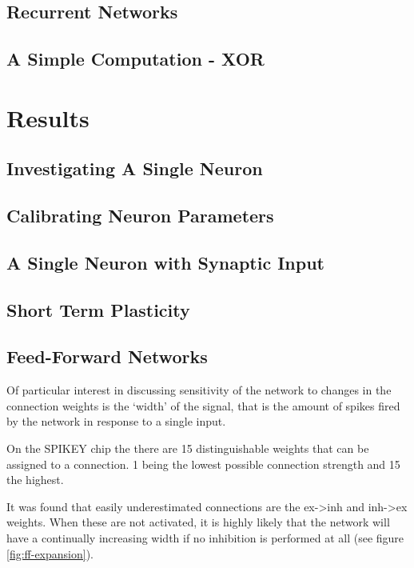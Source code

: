 \documentclass[10pt,a4paper]{article}
\begin{document}
\subsection{Recurrent Networks}

\subsection{A Simple Computation - XOR}

\section{Results}

\subsection{Investigating A Single Neuron}

\subsection{Calibrating Neuron Parameters}

\subsection{A Single Neuron with Synaptic Input}

\subsection{Short Term Plasticity}

\subsection{Feed-Forward Networks}
Of particular interest in discussing sensitivity of the network to changes in
the connection weights is the `width' of the signal, that is the amount of
spikes fired by the network in response to a single input.

On the SPIKEY chip the there are 15 distinguishable weights that can be
assigned to a connection. 1 being the lowest possible connection strength and 15
the highest.

It was found that easily underestimated connections are the ex->inh and inh->ex
weights. When these are not activated, it is highly likely that the network will
have a continually increasing width if no inhibition is performed at all (see
figure \ref{fig:ff-expansion}).
\end{document}
